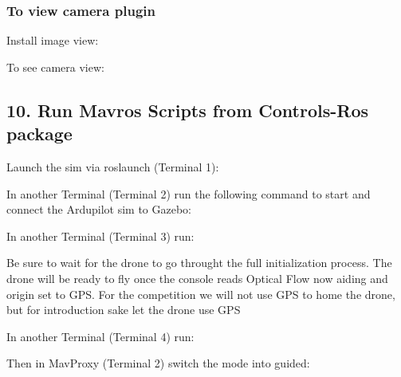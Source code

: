 \subsubsection*{To view camera plugin}

Install image view\+: 
\begin{DoxyCode}{0}
\end{DoxyCode}


To see camera view\+: 
\begin{DoxyCode}{0}
\end{DoxyCode}


\subsection*{10. Run Mavros Scripts from Controls-\/\+Ros package}

Launch the sim via roslaunch (Terminal 1)\+: 
\begin{DoxyCode}{0}
\end{DoxyCode}
 In another Terminal (Terminal 2) run the following command to start and connect the Ardupilot sim to Gazebo\+: 
\begin{DoxyCode}{0}
\end{DoxyCode}
 In another Terminal (Terminal 3) run\+: 
\begin{DoxyCode}{0}
\end{DoxyCode}
 Be sure to wait for the drone to go throught the full initialization process. The drone will be ready to fly once the console reads Optical Flow now aiding and origin set to G\+PS. For the competition we will not use G\+PS to home the drone, but for introduction sake let the drone use G\+PS

In another Terminal (Terminal 4) run\+: 
\begin{DoxyCode}{0}
\end{DoxyCode}


Then in Mav\+Proxy (Terminal 2) switch the mode into {\ttfamily guided}\+: 
\begin{DoxyCode}{0}
\end{DoxyCode}


